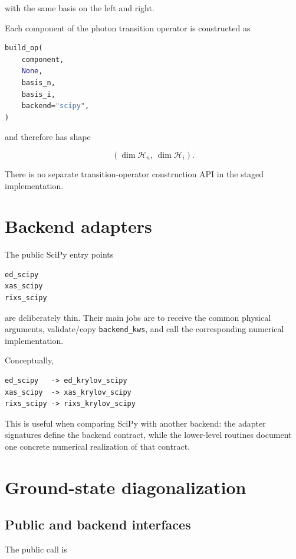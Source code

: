 \documentclass[11pt]{article}
\begin{document}
with the same basis on the left and right.

Each component of the photon transition operator is constructed as

\begin{lstlisting}[language=Python]
build_op(
    component,
    None,
    basis_n,
    basis_i,
    backend="scipy",
)
\end{lstlisting}

and therefore has shape

\begin{equation}
  (\dim \mathcal H_n,\,\dim \mathcal H_i).
\end{equation}

There is no separate transition-operator construction API in the staged implementation.

\section{Backend adapters}

The public SciPy entry points

\begin{lstlisting}
ed_scipy
xas_scipy
rixs_scipy
\end{lstlisting}

are deliberately thin.  Their main jobs are to receive the common physical arguments, validate/copy \texttt{backend\_kws}, and call the corresponding numerical implementation.

Conceptually,

\begin{lstlisting}
ed_scipy   -> ed_krylov_scipy
xas_scipy  -> xas_krylov_scipy
rixs_scipy -> rixs_krylov_scipy
\end{lstlisting}

This is useful when comparing SciPy with another backend: the adapter signatures define the backend contract, while the lower-level routines document one concrete numerical realization of that contract.

\section{Ground-state diagonalization}

\subsection{Public and backend interfaces}

The public call is
\end{document}
